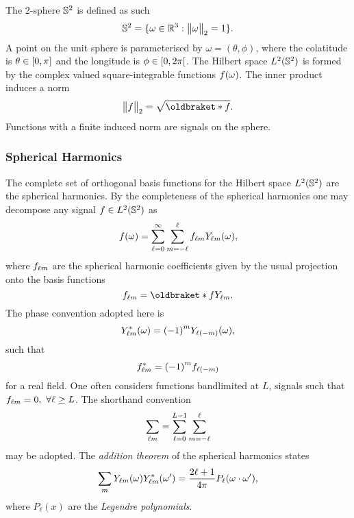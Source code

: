 The 2-sphere \(\twoSphere{}\) is defined as such
%
\begin{equation}
	\twoSphere{} = \set{\omega \in \mathbb{R}^{3} : \norm{\omega} = 1}.
\end{equation}
%
A point on the unit sphere is parameterised by \(\omega=(\theta,\phi)\), where the colatitude is \(\theta \in \interval{0}{\pi}\) and the longitude is \(\phi \in \interval[open right]{0}{2\pi}\).
The Hilbert space \(\hilbert{\twoSphere}\) is formed by the complex valued square-integrable functions \(\pixel{f}\).
The inner product induces a norm
%
\begin{equation}
	\norm{f} = \sqrt{\braket{f}}.
\end{equation}
%
Functions with a finite induced norm are signals on the sphere.

\subsubsection{Spherical Harmonics}

The complete set of orthogonal basis functions for the Hilbert space \(\hilbert{\twoSphere}\) are the spherical harmonics.
By the completeness of the spherical harmonics one may decompose any signal \(f \in \hilbert{\twoSphere}\) as
%
\begin{equation}
	\pixel{f}
	= \sum\limits_{\ell=0}^{\infty} \sum\limits_{m=-\ell}^{\ell} \harmonic{f} \pixel{\harmonic{Y}},
\end{equation}
%
where \(\harmonic{f}\) are the spherical harmonic coefficients given by the usual projection onto the basis functions
%
\begin{equation}
	\harmonic{f}
	= \braket{f}{\harmonic{Y}}.
\end{equation}
%
The phase convention adopted here is
%
\begin{equation}
	\pixel{\conj{\harmonic{Y}}}
	= {(-1)}^{m} \pixel{Y_{\ell(-m)}},
\end{equation}
%
such that
%
\begin{equation}
	\conj{\harmonic{f}}
	= {(-1)}^{m} f_{\ell(-m)}
\end{equation}
%
for a real field.
One often considers functions bandlimited at \(L\), \ie{} signals such that \(\harmonic{f} = 0,\ \forall \ell \geq L\).
The shorthand convention
%
\begin{equation}
	\harmonicSum
	= \sum\limits_{\ell=0}^{L-1} \sum\limits_{m=-\ell}^{\ell}
\end{equation}
%
may be adopted.
The \emph{addition theorem} of the spherical harmonics states
%
\begin{equation}\label{eq:chapter3_addition_theorem}
	\sum\limits_{m} \pixel{\harmonic{Y}} \pixel[']{\conj{\harmonic{Y}}}
	= \factor P_{\ell}(\omega \cdot \omega'),
\end{equation}
%
where \(P_{\ell}(x)\) are the \emph{Legendre polynomials}.


